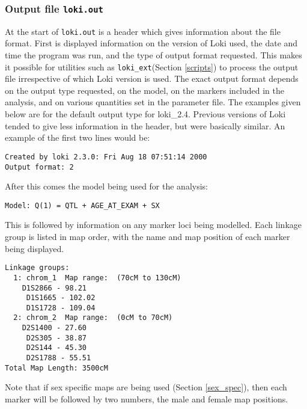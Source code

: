 \documentclass[10pt,a4paper]{article}
\newcommand{\Lokiext}{\texttt{loki\_ext}\xspace}
\begin{document}
\subsubsection{Output file \texttt{loki.out}}
At the start of \verb+loki.out+ is a header which gives information about
the file format.  First is displayed information on the version of Loki
used, the date and time the program was run, and the type of output format
requested.  This makes it possible for utilities such as \Lokiext (Section
\ref{scripts}) to process the output file irrespective of which Loki
version is used.  The exact output format depends on the output type
requested, on the model, on the markers included in the analysis, and on
various quantities set in the parameter file.  The examples given below
are for the default output type for loki\_2.4.  Previous versions of Loki
tended to give less information in the header, but were basically similar.
An example of the first two lines would be:
\begin{verbatim}
Created by loki 2.3.0: Fri Aug 18 07:51:14 2000
Output format: 2
\end{verbatim}
After this comes the model being used for the analysis:
\begin{verbatim}
Model: Q(1) = QTL + AGE_AT_EXAM + SX
\end{verbatim}
This is followed by information on any marker loci being modelled. Each linkage
group is listed in map order, with the name and map position of each marker
being displayed.
\begin{verbatim}
Linkage groups:
  1: chrom_1  Map range:  (70cM to 130cM)
    D1S2866 - 98.21
	 D1S1665 - 102.02
	 D1S1728 - 109.04
  2: chrom_2  Map range:  (0cM to 70cM)
    D2S1400 - 27.60
	 D2S305 - 38.87
	 D2S144 - 45.30
	 D2S1788 - 55.51
Total Map Length: 3500cM
\end{verbatim}
Note that if sex specific maps are being used (Section \ref{sex_spec}), then
each marker will be followed by two numbers, the male and female map positions.
\end{document}
